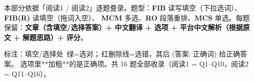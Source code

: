 
\vspace{1mm}
{\small\color{gray} 本部分依据「阅读1 / 阅读2」逐题誊录。题型：\textbf{FIB} 读写填空（下拉选词）、\textbf{FIB(R)} 读填空（拖词入空）、
\textbf{MCM} 多选、\textbf{RO} 段落重排、\textbf{MCS} 单选。每题保留：\textbf{文章（含填空/选择答案）+ 中文翻译 + 选项 + 平台中文解析（根据原文 + 解题思路）+ 评分}。}
\vspace{1mm}

\begin{notebox}
{\footnotesize 标注：填空/选择处 {\color{cFix}\,绿=选对}；{\color{cWrong}\,红删除线=选错}，其后 {\footnotesize\color{cFix}(答案: 正确词)} 给正确答案。
选项里**加粗**的是正确项。共 16 题全部收录（阅读1 = Q1–Q10，阅读2 = Q11–Q16）。}
\end{notebox}


